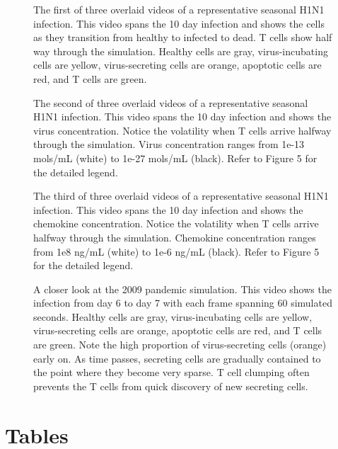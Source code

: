 \documentclass[10pt]{article}
\begin{document}
\setcounter{figure}{0}
\renewcommand{\figurename}{Video}

\begin{figure}[ht!]
\caption{The first of three overlaid videos of a representative seasonal H1N1 infection.  This video spans the 10 day infection and shows the cells as they transition from healthy to infected to dead.  T cells show half way through the simulation.  Healthy cells are gray, virus-incubating cells are yellow, virus-secreting cells are orange, apoptotic cells are red, and T cells are green.} 
 \label{video:cell_view}
\end{figure}

\begin{figure}[ht!]
\caption{The second of three overlaid videos of a representative seasonal H1N1 infection.  This video spans the 10 day infection and shows the virus concentration.  Notice the volatility when T cells arrive halfway through the simulation.  Virus concentration ranges from 1e-13 mols/mL (white) to 1e-27 mols/mL (black).  Refer to Figure 5 for the detailed legend. } 
 \label{video:virus_view}
\end{figure}

\begin{figure}[ht!]
\caption{The third of three overlaid videos of a representative seasonal H1N1 infection.  This video spans the 10 day infection and shows the chemokine concentration.  Notice the volatility when T cells arrive halfway through the simulation.  Chemokine concentration ranges from 1e8 ng/mL (white) to 1e-6 ng/mL (black).  Refer to Figure 5 for the detailed legend. } 
 \label{video:chemokine_view}
\end{figure}

\begin{figure}[ht!]
\caption{A closer look at the 2009 pandemic simulation.  This video shows the infection from day 6 to day 7 with each frame spanning 60 simulated seconds.  Healthy cells are gray, virus-incubating cells are yellow, virus-secreting cells are orange, apoptotic cells are red, and T cells are green.  Note the high proportion of virus-secreting cells (orange) early on.  As time passes, secreting cells are gradually contained to the point where they become very sparse.  T cell clumping often prevents the T cells from quick discovery of new secreting cells.}
\end{figure}

\pagebreak

\section*{Tables}
\end{document}
